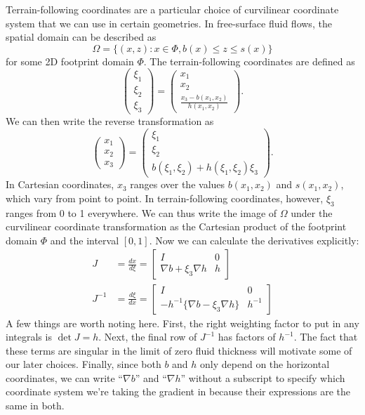 \documentclass{article}
\theoremstyle{definition}
\theoremstyle{plain}
\begin{document}
Terrain-following coordinates are a particular choice of curvilinear coordinate system that we can use in certain geometries.
In free-surface fluid flows, the spatial domain can be described as
\begin{equation}
    \Omega = \{(x, z) : x \in \Phi, b(x) \le z \le s(x)\}
\end{equation}
for some 2D footprint domain $\Phi$.
The terrain-following coordinates are defined as
\begin{equation}
    \left(\begin{matrix}\xi_1 \\ \xi_2 \\ \xi_3\end{matrix}\right) = \left(\begin{matrix} x_1 \\ x_2 \\ \frac{x_3 - b(x_1, x_2)}{h(x_1, x_2)}\end{matrix}\right).
\end{equation}
We can then write the reverse transformation as
\begin{equation}
    \left(\begin{matrix} x_1 \\ x_2 \\ x_3\end{matrix}\right) = \left(\begin{matrix}\xi_1 \\ \xi_2 \\ b(\xi_1, \xi_2) + h(\xi_1, \xi_2)\xi_3\end{matrix}\right).
\end{equation}
In Cartesian coordinates, $x_3$ ranges over the values $b(x_1, x_2)$ and $s(x_1, x_2)$, which vary from point to point.
In terrain-following coordinates, however, $\xi_3$ ranges from 0 to 1 everywhere.
We can thus write the image of $\Omega$ under the curvilinear coordinate transformation as the Cartesian product of the footprint domain $\Phi$ and the interval $[0, 1]$.
Now we can calculate the derivatives explicitly:
\begin{align}
    J & = \frac{dx}{d\xi} = \left[\begin{matrix}I & 0 \\ \nabla b + \xi_3\nabla h & h\end{matrix}\right] \\
    J^{-1} & = \frac{d\xi}{dx} = \left[\begin{matrix} I & 0 \\ -h^{-1}\{\nabla b - \xi_3\nabla h\} & h^{-1}\end{matrix}\right]
\end{align}
A few things are worth noting here.
First, the right weighting factor to put in any integrals is $\det J = h$.
Next, the final row of $J^{-1}$ has factors of $h^{-1}$.
The fact that these terms are singular in the limit of zero fluid thickness will motivate some of our later choices.
Finally, since both $b$ and $h$ only depend on the horizontal coordinates, we can write ``$\nabla b$'' and ``$\nabla h$'' without a subscript to specify which coordinate system we're taking the gradient in because their expressions are the same in both.
\end{document}
